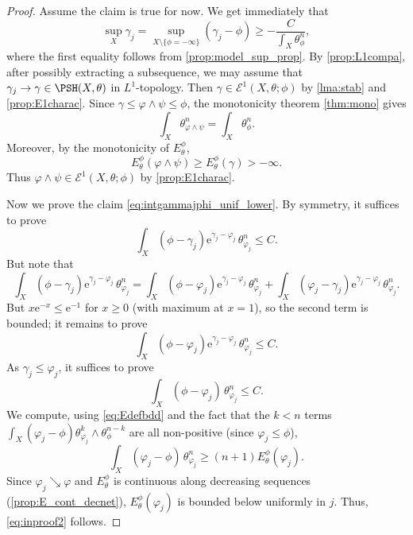 \begin{proof}
	Assume the claim is true for now.
	We get immediately that
    \[
    \sup_{X}\gamma_j=\sup_{X\setminus \{\phi=-\infty\}}(\gamma_j-\phi)\geq -\frac{C}{\int_X \theta_{\phi}^n},
    \]
    where the first equality follows from \cref{prop:model_sup_prop}.
    By \cref{prop:L1compa}, after possibly extracting a subsequence, we may assume that $\gamma_j\to \gamma\in \PSH(X,\theta)$ in $L^1$-topology.
    Then $\gamma\in \mathcal{E}^1(X,\theta;\phi)$ by \cref{lma:stab} and \cref{prop:E1charac}. Since $\gamma\leq\varphi\land\psi\leq\phi$, the monotonicity theorem \cref{thm:mono} gives
    \[
        \int_X\theta_{\varphi\land\psi}^n=\int_X\theta_\phi^n.
    \]
    Moreover, by the monotonicity of $E^\phi_\theta$,
    \[
        E^\phi_\theta(\varphi\land\psi)\geq E^\phi_\theta(\gamma)>-\infty.
    \]
    Thus $\varphi\land\psi\in\mathcal E^1(X,\theta;\phi)$ by \cref{prop:E1charac}.


	Now we prove the claim \eqref{eq:intgammajphi_unif_lower}.
	By symmetry, it suffices to prove
	\[
	\int_X (\phi-\gamma_j) \mathrm{e}^{\gamma_j-\varphi_j}\,\theta_{\varphi_j}^n\leq C.
	\]
	But note that
	\[
	\int_X (\phi-\gamma_j) \mathrm{e}^{\gamma_j-\varphi_j}\,\theta_{\varphi_j}^n=\int_X (\phi-\varphi_j) \mathrm{e}^{\gamma_j-\varphi_j}\,\theta_{\varphi_j}^n+\int_X (\varphi_j-\gamma_j) \mathrm{e}^{\gamma_j-\varphi_j}\,\theta_{\varphi_j}^n.
	\]
	But $x \mathrm{e}^{-x}\leq \mathrm{e}^{-1}$ for $x\geq 0$ (with maximum at $x=1$), so the second term is bounded; it remains to prove
	\[
	\int_X (\phi-\varphi_j) \mathrm{e}^{\gamma_j-\varphi_j}\,\theta_{\varphi_j}^n\leq C.
	\]
	As $\gamma_j\leq \varphi_j$, it suffices to prove
	\begin{equation}\label{eq:inproof2}
		\int_X (\phi-\varphi_j)\,\theta_{\varphi_j}^n\leq C.
	\end{equation}
    We compute, using \eqref{eq:Edefbdd} and the fact that the $k<n$ terms
    $\int_X(\varphi_j-\phi)\theta_{\varphi_j}^k\wedge\theta_\phi^{n-k}$ are all non-positive (since $\varphi_j\leq \phi$),
    \[
        \int_X (\varphi_j-\phi)\,\theta_{\varphi_j}^n\geq (n+1)E_{\theta}^{\phi}(\varphi_j).
    \]
	Since $\varphi_j\searrow\varphi$ and $E_\theta^{\phi}$ is continuous along decreasing sequences (\cref{prop:E_cont_decnet}), $E_\theta^{\phi}(\varphi_j)$ is bounded below uniformly in $j$. Thus, \eqref{eq:inproof2} follows.
\end{proof}



